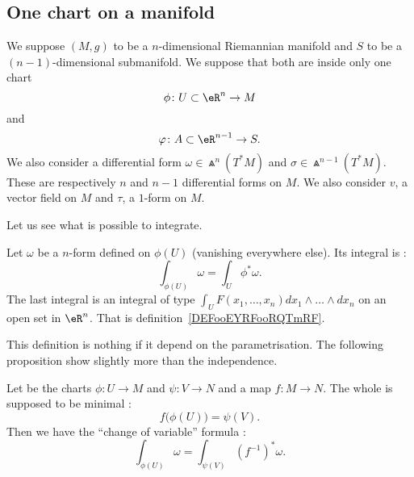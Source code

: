 \subsection{One chart on a manifold}

We suppose \( (M,g)\) to be a \( n\)-dimensional Riemannian manifold and \( S\) to be a \( (n-1)\)-dimensional submanifold. We suppose that both are inside only one chart
\begin{equation}
	\phi\colon U\subset \eR^n\to M
\end{equation}
and
\begin{equation}
	\varphi\colon A\subset \eR^{n-1}\to S.
\end{equation}
We also consider a differential form \( \omega\in \Wedge^n(T^*M)\) and \( \sigma\in\Wedge^{n-1}(T^*M)\). These are respectively \( n\) and \( n-1\) differential forms on \( M\).  We also consider \( v\), a vector field on \( M\) and \( \tau\), a \( 1\)-form on \(M\).

Let us see what is possible to integrate.

\begin{definition}       \label{DEFooPDRCooPiBklC}
	Let \( \omega\) be a \( n\)-form defined on \( \phi(U)\) (vanishing everywhere else). Its integral is :
	\begin{equation}
		\int_{\phi(U)}\omega=\int_U\phi^*\omega.
	\end{equation}
	The last integral is an integral of type \( \int_{U}F(x_1,\ldots, x_n)dx_1\wedge\ldots \wedge dx_n\) on an open set in \( \eR^n\). That is definition~\ref{DEFooEYRFooRQTmRF}.
\end{definition}

This definition is nothing if it depend on the parametrisation. The following proposition show slightly more than the independence.
\begin{proposition}       \label{PROPooNJCLooMqeeeX}
	Let be the charts \( \phi\colon U\to M\) and \( \psi\colon V\to N\) and a map \( f\colon M\to N\). The whole is supposed to be minimal :
	\begin{equation}
		f\big( \phi(U) \big)=\psi(V).
	\end{equation}
	Then we have the ``change of variable'' formula :
	\begin{equation}
		\int_{\phi(U)}\omega=\int_{\psi(V)}(f^{-1})^*\omega.
	\end{equation}
\end{proposition}

